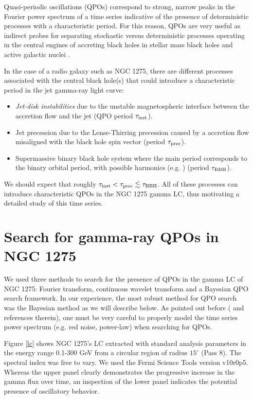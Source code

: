 \documentclass{iau}
\begin{document}
Quasi-periodic oscillations (QPOs) correspond to strong, narrow peaks in the Fourier power spectrum of a time series indicative of the presence of deterministic processes with a characteristic period. For this reason, QPOs are very useful as indirect probes for separating stochastic versus deterministic processes operating in the central engines of accreting black holes in stellar mass black holes and active galactic nuclei \cite{Remillard2006, Gierlinski2008}. 

In the case of a radio galaxy such as NGC 1275, there are different processes associated with the central black hole(s) that could introduce a characteristic period in the jet gamma-ray light curve:
\begin{itemize}
\item \textit{Jet-disk instabilities} due to the unstable magnetospheric interface between the accretion flow and the jet \cite{McKinney2012} (QPO period $\tau_{\rm inst}$).
\item Jet precession due to the Lense-Thirring precession caused by a  accretion flow misaligned with the black hole spin vector \cite{Liska2018} (period $\tau_{\rm prec}$).
\item Supermassive binary black hole system where the main period corresponds to the binary orbital period, with possible harmonics (e.g. \cite{Roedig2012, Gold2014a}) (period $\tau_{\rm BBH}$).
\end{itemize}
We should expect that roughly $\tau_{\rm inst} < \tau_{\rm prec} \lesssim \tau_{\rm BBH}$. All of these processes can introduce characteristic QPOs in the NGC 1275 gamma LC, thus motivating a detailed study of this time series.  




\section{Search for gamma-ray QPOs in NGC 1275}

We used three methods to search for the presence of QPOs in the gamma LC of NGC 1275: Fourier transform, continuous wavelet transform and a Bayesian QPO search framework. In our experience, the most robust method for QPO search was the Bayesian method as we will describe below. As pointed out before (\cite{Vaughan2016} and references therein), one must be very careful to properly model the time series power spectrum (e.g. red noise, power-law) when searching for QPOs. 

Figure \ref{lc} shows NGC 1275's LC extracted with standard analysis parameters in the energy range 0.1-300 GeV from a circular region of radius $15^{\circ}$ (Pass 8). The spectral index was free to vary. We used the Fermi Science Tools version v10r0p5. Whereas the upper panel clearly demonstrates the progressive increase in the gamma flux over time, an inspection of the lower panel indicates the potential presence of oscillatory behavior. 
\end{document}
